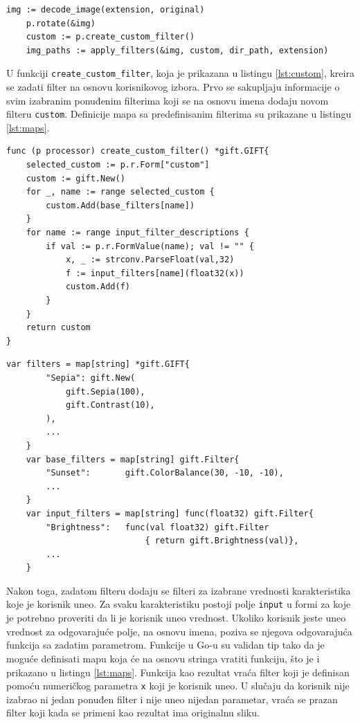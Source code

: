 \documentclass[12pt,oneside]{memoir}
\begin{document}
\begin{center}
\begin{lstlisting}[caption=Primena filtera u funkciji ImageHandler,label={lst:IHfilter},  backgroundcolor=\color{background}]
	img := decode_image(extension, original)
	p.rotate(&img)
	custom := p.create_custom_filter()
	img_paths := apply_filters(&img, custom, dir_path, extension)
\end{lstlisting}
\end{center}

U funkciji  \texttt{create\_custom\_filter}, koja je prikazana u listingu \ref{lst:custom}, kreira se zadati filter na osnovu korisnikovog izbora. Prvo se sakupljaju informacije o svim izabranim ponuđenim filterima koji se na osnovu imena dodaju novom filteru  \texttt{custom}. Definicije mapa sa predefinisanim filterima su prikazane u listingu \ref{lst:maps}. 

\begin{center}
\begin{lstlisting}[caption=Funkcija za kreiranje zadatog filtera,label={lst:custom}, backgroundcolor=\color{background}]
func (p processor) create_custom_filter() *gift.GIFT{
	selected_custom := p.r.Form["custom"]
	custom := gift.New()
	for _, name := range selected_custom {
		custom.Add(base_filters[name])
	}
	for name := range input_filter_descriptions {
		if val := p.r.FormValue(name); val != "" {
			x, _ := strconv.ParseFloat(val,32)
			f := input_filters[name](float32(x))
			custom.Add(f)
		}
	}
	return custom
}
\end{lstlisting}
\end{center}

\begin{center}
\begin{lstlisting}[caption=Mape koje se koriste za definisanje različitih vrsta filtera,label={lst:maps},  backgroundcolor=\color{background}]
	var filters = map[string] *gift.GIFT{
		"Sepia": gift.New(
			gift.Sepia(100),
			gift.Contrast(10),
		),
		...
	}
	var base_filters = map[string] gift.Filter{
		"Sunset":      	gift.ColorBalance(30, -10, -10),
		...
	}
	var input_filters = map[string] func(float32) gift.Filter{
		"Brightness":	func(val float32) gift.Filter 
							{ return gift.Brightness(val)},
		...
	}
\end{lstlisting}
\end{center}

Nakon toga, zadatom filteru dodaju se filteri za izabrane vrednosti karakteristika koje je korisnik uneo. Za svaku karakteristiku postoji polje \texttt{input} u formi za koje je potrebno proveriti da li je korisnik uneo vrednost. Ukoliko korisnik jeste uneo vrednost za odgovarajuće polje, na osnovu imena, poziva se njegova odgovarajuća funkcija sa zadatim parametrom. Funkcije u Go-u su validan tip tako da je moguće definisati mapu koja će na osnovu stringa vratiti funkciju, što je i prikazano u listingu \ref{lst:maps}. Funkcija kao rezultat vraća filter koji je definisan pomoću numeričkog parametra  \texttt{x} koji je korisnik uneo. U slučaju da korisnik nije izabrao ni jedan ponuđen filter i nije uneo nijedan parametar, vraća se prazan filter koji kada se primeni kao rezultat ima originalnu sliku.
\end{document}
